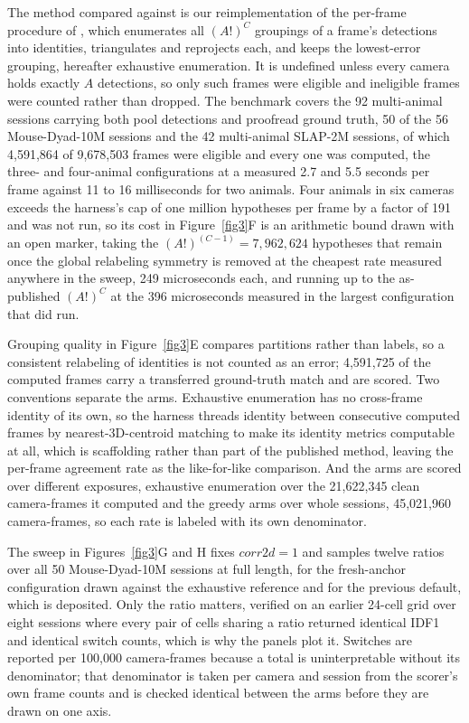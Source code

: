 \documentclass[11pt]{article}
\begin{document}
The method compared against is our reimplementation of the per-frame procedure of \citep{Maree2024}, which enumerates all $(A!)^C$ groupings of a frame's detections into identities, triangulates and reprojects each, and keeps the lowest-error grouping, hereafter exhaustive enumeration. It is undefined unless every camera holds exactly $A$ detections, so only such frames were eligible and ineligible frames were counted rather than dropped. The benchmark covers the 92 multi-animal sessions carrying both pool detections and proofread ground truth, 50 of the 56 Mouse-Dyad-10M sessions and the 42 multi-animal SLAP-2M sessions, of which 4,591,864 of 9,678,503 frames were eligible and every one was computed, the three- and four-animal configurations at a measured 2.7 and 5.5 seconds per frame against 11 to 16 milliseconds for two animals. Four animals in six cameras exceeds the harness's cap of one million hypotheses per frame by a factor of 191 and was not run, so its cost in Figure~\ref{fig3}F is an arithmetic bound drawn with an open marker, taking the $(A!)^{(C-1)} = 7{,}962{,}624$ hypotheses that remain once the global relabeling symmetry is removed at the cheapest rate measured anywhere in the sweep, 249 microseconds each, and running up to the as-published $(A!)^C$ at the 396 microseconds measured in the largest configuration that did run.

Grouping quality in Figure~\ref{fig3}E compares partitions rather than labels, so a consistent relabeling of identities is not counted as an error; 4,591,725 of the computed frames carry a transferred ground-truth match and are scored. Two conventions separate the arms. Exhaustive enumeration has no cross-frame identity of its own, so the harness threads identity between consecutive computed frames by nearest-3D-centroid matching to make its identity metrics computable at all, which is scaffolding rather than part of the published method, leaving the per-frame agreement rate as the like-for-like comparison. And the arms are scored over different exposures, exhaustive enumeration over the 21,622,345 clean camera-frames it computed and the greedy arms over whole sessions, 45,021,960 camera-frames, so each rate is labeled with its own denominator.

The sweep in Figures~\ref{fig3}G and H fixes $corr2d = 1$ and samples twelve ratios over all 50 Mouse-Dyad-10M sessions at full length, for the fresh-anchor configuration drawn against the exhaustive reference and for the previous default, which is deposited. Only the ratio matters, verified on an earlier 24-cell grid over eight sessions where every pair of cells sharing a ratio returned identical IDF1 and identical switch counts, which is why the panels plot it. Switches are reported per 100,000 camera-frames because a total is uninterpretable without its denominator; that denominator is taken per camera and session from the scorer's own frame counts and is checked identical between the arms before they are drawn on one axis.
\end{document}

